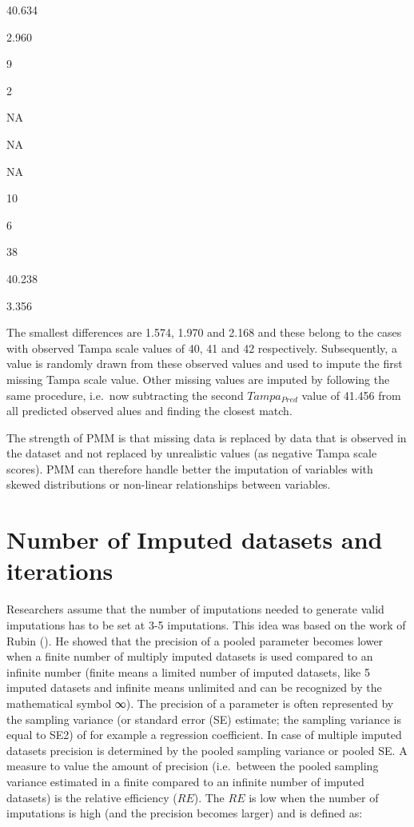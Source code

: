\documentclass[]{book}
\begin{document}
40.634

2.960

9

2

NA

NA

NA

10

6

38

40.238

3.356

The smallest differences are 1.574, 1.970 and 2.168 and these belong to
the cases with observed Tampa scale values of 40, 41 and 42
respectively. Subsequently, a value is randomly drawn from these
observed values and used to impute the first missing Tampa scale value.
Other missing values are imputed by following the same procedure,
i.e.~now subtracting the second \(Tampa_{Pred}\) value of 41.456 from
all predicted observed alues and finding the closest match.

The strength of PMM is that missing data is replaced by data that is
observed in the dataset and not replaced by unrealistic values (as
negative Tampa scale scores). PMM can therefore handle better the
imputation of variables with skewed distributions or non-linear
relationships between variables.

\section{Number of Imputed datasets and
iterations}\label{number-of-imputed-datasets-and-iterations}

Researchers assume that the number of imputations needed to generate
valid imputations has to be set at 3-5 imputations. This idea was based
on the work of Rubin (\citet{Rubin1987}). He showed that the precision
of a pooled parameter becomes lower when a finite number of multiply
imputed datasets is used compared to an infinite number (finite means a
limited number of imputed datasets, like 5 imputed datasets and infinite
means unlimited and can be recognized by the mathematical symbol ∞). The
precision of a parameter is often represented by the sampling variance
(or standard error (SE) estimate; the sampling variance is equal to SE2)
of for example a regression coefficient. In case of multiple imputed
datasets precision is determined by the pooled sampling variance or
pooled SE. A measure to value the amount of precision (i.e.~between the
pooled sampling variance estimated in a finite compared to an infinite
number of imputed datasets) is the relative efficiency (\(RE\)). The
\(RE\) is low when the number of imputations is high (and the precision
becomes larger) and is defined as:
\end{document}
